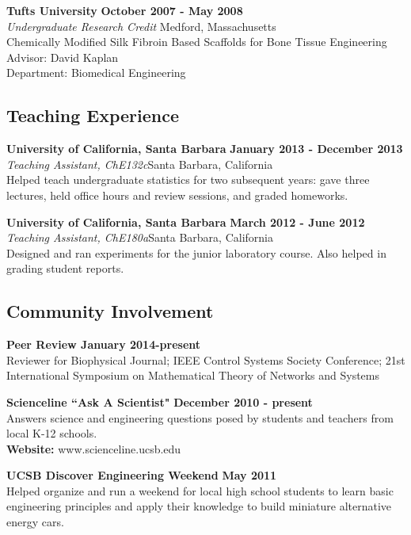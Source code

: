 {{\bf Tufts University} \hfill {\bf October 2007 - May 2008}\\
{\em Undergraduate Research Credit} \hfill Medford, Massachusetts\\
Chemically Modified Silk Fibroin Based Scaffolds for Bone Tissue Engineering\\
Advisor: David Kaplan\\
Department: Biomedical Engineering

\subsection*{Teaching Experience}
{\bf University of California, Santa Barbara}  \hfill {\bf January 2013 -
  December 2013}\\
{\em Teaching Assistant, ChE132c}\hfill  Santa Barbara, California\\
Helped teach undergraduate statistics for two subsequent years: gave three
lectures, held office hours and review sessions, and graded homeworks.

{\bf University of California, Santa Barbara} \hfill {\bf March 2012 - June 2012}\\
{\em Teaching Assistant, ChE180a}\hfill  Santa Barbara, California\\
Designed and ran experiments for the junior laboratory course. Also helped in grading student reports.

\subsection*{Community Involvement}
{\bf Peer Review \hfill January 2014-present}\\
Reviewer for Biophysical Journal;  IEEE Control Systems Society Conference; 21st International Symposium on
Mathematical Theory of Networks and Systems

{\bf Scienceline ``Ask A Scientist"} \hfill {\bf December 2010 - present}\\
Answers science and engineering questions posed by students and teachers from local K-12 schools. \\
{\bfseries Website:} www.scienceline.ucsb.edu

{\bf UCSB Discover Engineering Weekend} \hfill {\bf May 2011}\\
Helped organize and run a weekend for local high school students to learn basic engineering principles and apply their knowledge to build miniature alternative energy cars.

}
